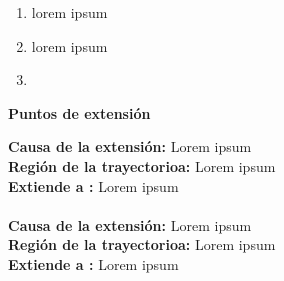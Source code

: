 \begin{enumerate}[{B-}1.]

	\item \actor lorem ipsum
	\item \sistema lorem ipsum
	\item \finTA	

\end{enumerate}




\begin{large}
	\textbf{Puntos de extensión}\\
\end{large}	

\textbf{Causa de la extensión:} Lorem ipsum\\
\textbf{Región de la trayectorioa:} Lorem ipsum\\
\textbf{Extiende a :} Lorem ipsum\\\\

\textbf{Causa de la extensión:} Lorem ipsum\\
\textbf{Región de la trayectorioa:} Lorem ipsum\\
\textbf{Extiende a :} Lorem ipsum\\

